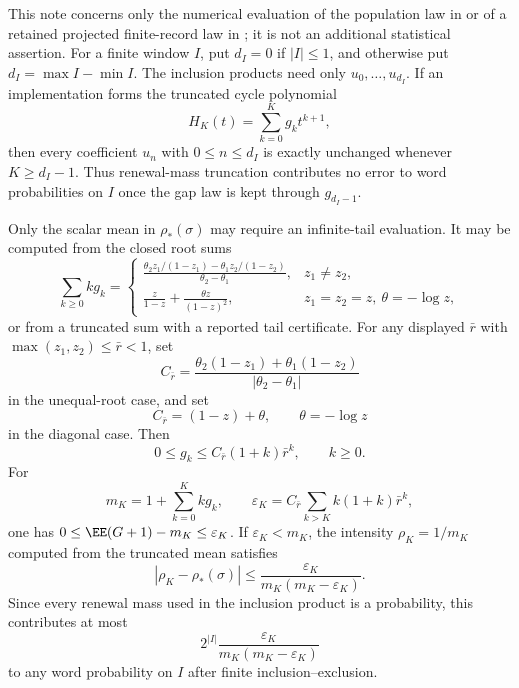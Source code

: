 \begin{remark}\label{rem:complete-law-numerical-implementation-main}
This note concerns only the numerical evaluation of the population law in
 or of a retained
projected finite-record law in
; it is not an
additional statistical assertion.  For a finite window \(I\), put \(d_I=0\) if
\(|I|\le1\), and otherwise put \(d_I=\max I-\min I\).  The inclusion products
need only \(u_0,\ldots,u_{d_I}\).  If an implementation forms the truncated
cycle polynomial
\[
H_K(t)=\sum_{k=0}^{K}g_k t^{k+1},
\]
then every coefficient \(u_n\) with \(0\le n\le d_I\) is exactly unchanged
whenever \(K\ge d_I-1\).  Thus renewal-mass truncation contributes no error to
word probabilities on \(I\) once the gap law is kept through \(g_{d_I-1}\).

Only the scalar mean in \(\rho_*(\sigma)\) may require an infinite-tail
evaluation.  It may be computed from the closed root sums
\[
\sum_{k\ge0}k g_k
=
\begin{cases}
\displaystyle
\frac{\theta_2 z_1/(1-z_1)-\theta_1 z_2/(1-z_2)}
     {\theta_2-\theta_1},
& z_1\ne z_2,\\[1.2em]
\displaystyle
\frac{z}{1-z}+\frac{\theta z}{(1-z)^2},
& z_1=z_2=z,\ \theta=-\log z,
\end{cases}
\]
or from a truncated sum with a reported tail certificate.  For any displayed
\(\bar r\) with \(\max(z_1,z_2)\le \bar r<1\), set
\[
C_{\bar r}=
\frac{\theta_2(1-z_1)+\theta_1(1-z_2)}
     {|\theta_2-\theta_1|}
\]
in the unequal-root case, and set
\[
C_{\bar r}=(1-z)+\theta,\qquad \theta=-\log z
\]
in the diagonal case.  Then
\[
0\le g_k\le C_{\bar r}(1+k)\bar r^k,\qquad k\ge0 .
\]
For
\[
m_K=1+\sum_{k=0}^{K}k g_k,\qquad
\varepsilon_K=C_{\bar r}\sum_{k>K}k(1+k)\bar r^k ,
\]
one has \(0\le\EE(G+1)-m_K\le\varepsilon_K\).  If
\(\varepsilon_K<m_K\), the intensity \(\rho_K=1/m_K\) computed from the
truncated mean satisfies
\begin{equation}\label{eq:rho-truncation-error-bound-main}
|\rho_K-\rho_*(\sigma)|
\le \frac{\varepsilon_K}{m_K(m_K-\varepsilon_K)} .
\end{equation}
Since every renewal mass used in the inclusion product is a probability, this
contributes at most
\[
2^{|I|}\frac{\varepsilon_K}{m_K(m_K-\varepsilon_K)}
\]
to any word probability on \(I\) after finite inclusion--exclusion.
\end{remark}

